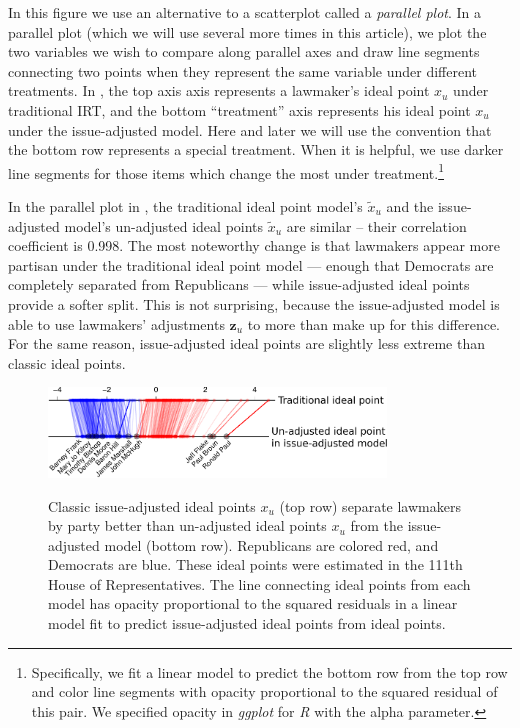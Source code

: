 In this figure we use an alternative to a scatterplot called a
\emph{parallel plot}.  In a parallel plot (which we will use several
more times in this article), we plot the two variables we wish to
compare along parallel axes and draw line segments connecting two
points when they represent the same variable under different
treatments.  In , the top axis axis
represents a lawmaker's ideal point $x_u$ under traditional IRT, and
the bottom ``treatment'' axis represents his ideal point $x_u$ under
the issue-adjusted model.  Here and later we will use the convention
that the bottom row represents a special treatment. When it is
helpful, we use darker line segments for those items which change
the most under treatment.\footnote{Specifically, we fit a linear model
  to predict the bottom row from the top row and color line segments
  with opacity proportional to the squared residual of this pair. We
  specified opacity in \emph{ggplot} for \emph{R} with the alpha
  parameter.}

In the parallel plot in , the traditional
ideal point model's $\tilde x_u$ and the issue-adjusted model's un-adjusted ideal
points $\tilde x_u$ are similar -- their correlation coefficient is
0.998. The most noteworthy change is that lawmakers appear more
partisan under the traditional ideal point model --- enough that
Democrats are completely separated from Republicans --- while
issue-adjusted ideal points provide a softer split.  This is not
surprising, because the issue-adjusted model is able to use lawmakers'
adjustments $\bm z_u$ to more than make up for this difference.  For
the same reason, issue-adjusted ideal points are slightly less extreme
than classic ideal points.

\begin{figure}
  \center
  \includegraphics[width=0.8\textwidth]{chapter_inferring_issue_preferences/figures/3393_issue_vs_ideal_sxs.pdf}
  \label{fig:jackman_vs_offset}
  \caption{Classic issue-adjusted ideal points $x_u$ (top row) separate lawmakers by party better than un-adjusted ideal points $x_u$ from the
    issue-adjusted model (bottom row).  Republicans are colored red,
    and Democrats are blue.  These ideal points were estimated in
    the 111th House of Representatives.  The line connecting ideal points from
    each model has opacity proportional to the squared residuals in a linear
    model fit to predict issue-adjusted ideal points from ideal
    points. }
\end{figure}

